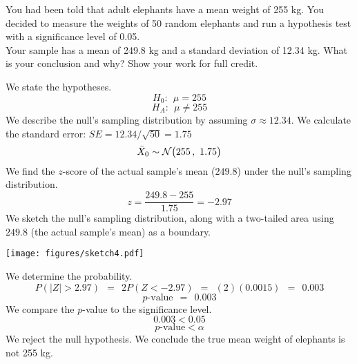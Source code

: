 \documentclass[12pt,letterpaper,addpoints]{exam}
\begin{document}
\begin{questions}
\newpage

\question[10] You had been told that adult elephants have a mean weight of 255 kg. You decided to measure the weights of 50 random elephants and run a hypothesis test with a significance level of 0.05.
\\
Your sample has a mean of 249.8 kg and a standard deviation of 12.34 kg. What is your conclusion and why? Show your work for full credit.
\begin{solution}
We state the hypotheses.
$$H_0: ~~\mu=255 $$
$$H_A: ~~\mu\ne 255 $$
We describe the null's sampling distribution by assuming $\sigma \approx 12.34$. We calculate the standard error: $SE = 12.34/\sqrt{50} = 1.75$
$$\bar{X}_0 \sim \mathcal{N}\big(255\,,~1.75\big) $$
We find the $z$-score of the actual sample's mean ($249.8$) under the null's sampling distribution.
$$z = \frac{249.8-255}{1.75} = -2.97 $$
We sketch the null's sampling distribution, along with a two-tailed area using $249.8$ (the actual sample's mean) as a boundary.
\begin{center}
\texttt{[image: figures/sketch4.pdf]}
\end{center}
We determine the probability.
$$P(|Z|>2.97) ~~=~~ 2 P(Z<-2.97) ~~=~~ (2)(0.0015) ~~=~~ 0.003$$
$$p\text{-value} ~~=~~ 0.003 $$
We compare the $p$-value to the significance level.
$$0.003 < 0.05 $$
$$p\text{-value} < \alpha $$
We reject the null hypothesis. We conclude the true mean weight of elephants is not 255 kg.
\end{solution}

\end{questions}
\end{document}
